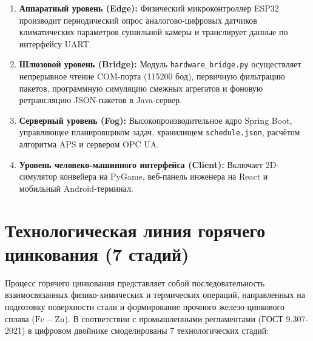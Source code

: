 \documentclass[14pt, a4paper]{extarticle}
\begin{document}
\begin{enumerate}
    \item \textbf{Аппаратный уровень (Edge):} Физический микроконтроллер ESP32 производит периодический опрос аналогово-цифровых датчиков климатических параметров сушильной камеры и транслирует данные по интерфейсу UART.
    \item \textbf{Шлюзовой уровень (Bridge):} Модуль \texttt{hardware\_bridge.py} осуществляет непрерывное чтение COM-порта (115200 бод), первичную фильтрацию пакетов, программную симуляцию смежных агрегатов и фоновую ретрансляцию JSON-пакетов в Java-сервер.
    \item \textbf{Серверный уровень (Fog):} Высокопроизводительное ядро Spring Boot, управляющее планировщиком задач, хранилищем \texttt{schedule.json}, расчётом алгоритма APS и сервером OPC UA.
    \item \textbf{Уровень человеко-машинного интерфейса (Client):} Включает 2D-симулятор конвейера на PyGame, веб-панель инженера на React и мобильный Android-терминал.
\end{enumerate}

\newpage
\section{Технологическая линия горячего цинкования (7 стадий)}

Процесс горячего цинкования представляет собой последовательность взаимосвязанных физико-химических и термических операций, направленных на подготовку поверхности стали и формирование прочного железо-цинкового сплава ($\mathrm{Fe-Zn}$). В соответствии с промышленными регламентами (ГОСТ 9.307-2021) в цифровом двойнике смоделированы 7 технологических стадий:
\end{document}
